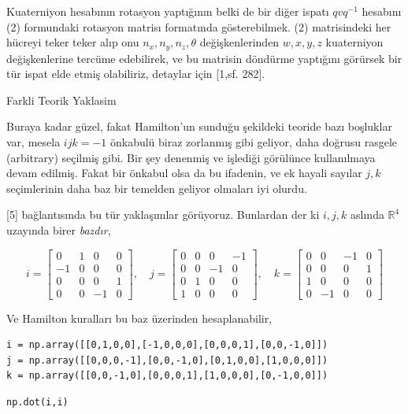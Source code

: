 \documentclass[12pt,fleqn]{article}\usepackage{../../common}
\begin{document}
Kuaterniyon hesabının rotasyon yaptığının belki de bir diğer ispatı $q v q^{-1}$
hesabını (2) formundaki rotasyon matrisı formatında gösterebilmek. (2)
matrisindeki her hücreyi teker teker alıp onu $n_x,n_y,n_z,\theta$
değişkenlerinden $w,x,y,z$ kuaterniyon değişkenlerine tercüme edebilirek, ve bu
matrisin döndürme yaptığını görürsek bir tür ispat elde etmiş olabiliriz,
detaylar için [1,sf. 282].

Farkli Teorik Yaklasim

Buraya kadar güzel, fakat Hamilton'un sunduğu şekildeki teoride bazı boşluklar
var, mesela $ijk = -1$ önkabulü biraz zorlanmış gibi geliyor, daha doğrusu
rasgele (arbitrary) seçilmiş gibi. Bir şey denenmiş ve işlediği görülünce
kullanılmaya devam edilmiş. Fakat bir önkabul olsa da bu ifadenin, ve ek hayali
sayılar $j,k$ seçimlerinin daha baz bir temelden geliyor olmaları iyi olurdu.

[5] bağlantısında bu tür yaklaşımlar görüyoruz. Bunlardan der ki $i,j,k$ aslında
$\mathbb{R}^4$ uzayında birer {\em bazdır},

$$
i = \left[\begin{array}{cccc}
0 & 1 & 0 & 0 \\ -1 & 0 & 0 & 0 \\ 0 & 0 & 0 & 1\\ 0 & 0 & -1 & 0 
\end{array}\right], \quad 
j = \left[\begin{array}{cccc}
0 & 0 & 0 & -1 \\ 0 & 0 & -1 & 0 \\ 0 & 1 & 0 & 0\\ 1 & 0 & 0 & 0 
\end{array}\right], \quad
k = \left[\begin{array}{cccc}
0 & 0 & -1 & 0 \\ 0 & 0 & 0 & 1 \\ 1 & 0 & 0 & 0\\ 0 & -1 & 0 & 0 
\end{array}\right]
$$

Ve Hamilton kuralları bu baz üzerinden hesaplanabilir,

\begin{verbatim}
i = np.array([[0,1,0,0],[-1,0,0,0],[0,0,0,1],[0,0,-1,0]])
j = np.array([[0,0,0,-1],[0,0,-1,0],[0,1,0,0],[1,0,0,0]])
k = np.array([[0,0,-1,0],[0,0,0,1],[1,0,0,0],[0,-1,0,0]])
\end{verbatim}

\begin{verbatim}
np.dot(i,i)
\end{verbatim}
\end{document}
